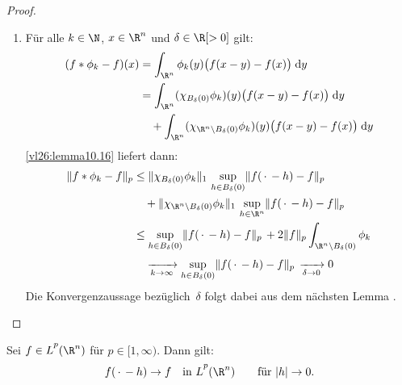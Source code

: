 \begin{proof}
\begin{enumerate}[(1)]
        \item Für alle $k\in\N$, $x\in\R^n$ und $\delta\in\R[>0]$ gilt:
            \begin{align*}
                (f\ast\phi_k-f)(x)
                &= \int_{\R^n} \phi_k(y) \bigl( f(x-y) - f(x) \bigr) \dif{y}
                \\
                &= 
                \int_{\R^n} (\chi_{B_\delta(0)}\phi_k)(y) \bigl( f(x-y) -
                f(x) \bigr) \dif{y}
                \\
                &\quad+
                \int_{\R^n} (\chi_{\R^n\setminus B_\delta(0)}
                \phi_k)(y) \bigl( f(x-y) - f(x) \bigr) \dif{y}
            \end{align*}
            \cref{vl26:lemma10.16} liefert dann:
            \begin{align*}
                \norm{f\ast\phi_k-f}_p
                &\leq \norm{\chi_{B_\delta(0)}\phi_k}_1
                    \, \sup_{h\in B_\delta(0)} \norm{f(\scdot-h)-f}_p
                \\
                &\quad+
                    \norm{\chi_{\R^n\setminus B_\delta(0)}\phi_k}_1
                    \, \sup_{h\in\R^n} \norm{f(\scdot-h)-f}_p
                \\
                &\leq
                        \sup_{h\in B_\delta(0)} \norm{f(\scdot-h)-f}_p
                    \,+
                        2\norm{f}_p \int_{\R^n\setminus B_\delta(0)} \phi_k
                \\[0.5ex]
                &\quad
                    \xrightarrow[k\to\infty]{} 
                        \sup_{h\in B_\delta(0)} \norm{f(\scdot-h)-f}_p
                    \,
                    \xrightarrow[\delta\to 0]{} 0
            \end{align*}
            Die Konvergenzaussage bezüglich~$\delta$ folgt dabei aus dem
            nächsten Lemma .
    \end{enumerate}
\end{proof}

\begin{thLemma}%
    \label{vl27:stetlpmittel}
    Sei $f\in\Lpp(\R^n)$ für $p\in[1,\infty)$. Dann gilt:
    \[ f(\scdot-h)\to f 
        \quad\text{in $\Lpp(\R^n)$} \fuer\abs{h}\to0
    . \]
\end{thLemma}

